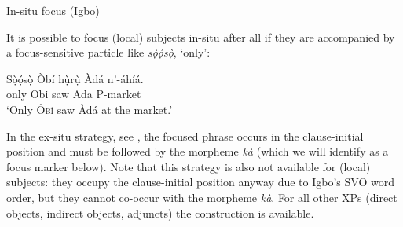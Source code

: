 \documentclass[output=paper,colorlinks,citecolor=brown]{langscibook}
\begin{document}
\ea%
    \label{ex:amaechi:3}
    In-situ focus (Igbo)\\
    \z
\z

It is possible to focus (local) subjects in-situ after all if they are accompanied by a focus-sensitive particle like \textit{sọ̀ọ́sọ̀}, `only':

\ea%
    \label{ex:amaechi:4}
    \gll    Sọ̀ọ́sọ̀ Òbí hụ̀rụ̀ Àdá n'-áhíá.\\
            only Obi saw Ada P-market\\
    \glt    `Only \textsc{Òbí} saw Àdá at the market.'
\z

In the ex-situ strategy, see , the focused phrase occurs in the clause-initial position and must be followed by the morpheme \textit{k\`a} (which we will identify as a focus marker below). Note that this strategy is also not available for (local) subjects: they occupy the clause-initial position anyway due to Igbo's  SVO word order, but they cannot co-occur with the morpheme \textit{k\`a}. For all other XPs (direct objects, indirect objects, adjuncts) the construction is available.
\end{document}
